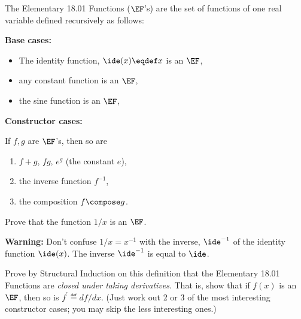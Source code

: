 
\inhandout{
\decideaboutsolutions
\usesimpleproblems
}


\begin{problem}
%
The Elementary 18.01 Functions ($\EF$'s) are the set of functions of
one real variable defined recursively as follows:

\textbf{Base cases:}
\begin{itemize}
\item The identity function, $\ide(x) \eqdef x$ is an $\EF$,
\item any constant function is an $\EF$,
\item the sine function is an $\EF$,
\end{itemize}

\textbf{Constructor cases:}

If $f,g$ are $\EF$'s, then so are
\begin{enumerate}
\item $f + g$, $fg$, $e^g$ (the constant $e$),\label{+-}
\item the inverse function $f^{-1}$,\label{inversefunc}
\item the composition $f \compose g$.\label{cmp}
\end{enumerate}

\bparts

\ppart\label{1over} Prove that the function $1/x$ is an $\EF$.

\textbf{Warning:} Don't confuse $1/x = x^{-1}$ with the inverse,
$\ide^{-1}$ of the identity function $\ide(x)$.  The inverse
$\ide^{-1}$ is equal to $\ide$.


\ppart Prove by Structural Induction on this definition that the
Elementary 18.01 Functions are \emph{closed under taking derivatives}.
That is, show that if $f(x)$ is an $\EF$, then so is $f^{\prime} \eqdef
df/dx$.  (Just work out 2 or 3 of the most interesting constructor cases;
you may skip the less interesting ones.)


\end{problem}
